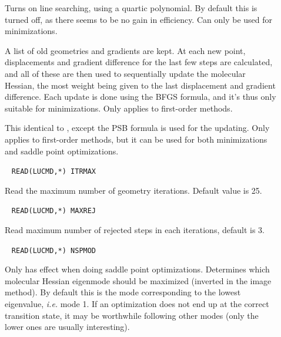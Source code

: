 \begin{description}

\item[]
Turns on line searching,
using a quartic polynomial. By default this
is turned off, as there seems to be no gain in efficiency. Can only be
used for minimizations.

\item[]
A list of old geometries and gradients are kept. At each new point,
displacements and gradient difference for the last few steps are
calculated, and all of these are then used to sequentially update the
molecular Hessian, the most weight being given to the last displacement and
gradient difference. Each update is done using the BFGS formula, and
it's thus only suitable for minimizations. Only applies to first-order
methods.

\item[]
This identical to , except the PSB formula is used for the
updating. Only applies to first-order methods, but it can be used for both minimizations and saddle
point optimizations.

\item[]\verb| | \newline
\verb|READ(LUCMD,*) ITRMAX|

Read the maximum number of geometry iterations.
Default value is 25.

\item[]\verb| | \newline
\verb|READ(LUCMD,*) MAXREJ|

Read maximum number of rejected steps
in each iterations, default is 3.

\item[]\verb| | \newline
\verb|READ(LUCMD,*) NSPMOD|

Only has effect when doing saddle point optimizations.
Determines which molecular Hessian eigenmode should be maximized (inverted in the image
method). By default this is the mode corresponding to the lowest
eigenvalue, {\it i.e.\/} mode 1. If an optimization does not end up at
the correct transition state, it may be worthwhile following other modes
(only the lower ones are usually interesting).


\end{description}
